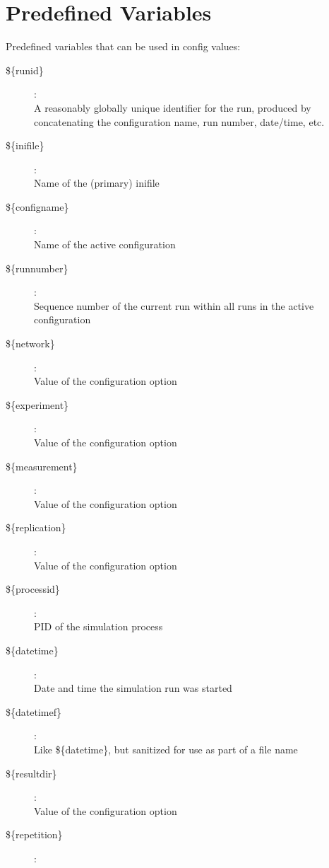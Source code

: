 \section{Predefined Variables}
\label{sec:config-options:predefined-variables}

Predefined variables that can be used in config values:

\begin{description}
\item[\$\{runid\}] : \\
    A reasonably globally unique identifier for the run, produced by
    concatenating the configuration name, run number, date/time, etc.
\item[\$\{inifile\}] : \\
    Name of the (primary) inifile
\item[\$\{configname\}] : \\
    Name of the active configuration
\item[\$\{runnumber\}] : \\
    Sequence number of the current run within all runs in the active
    configuration
\item[\$\{network\}] : \\
    Value of the  configuration option
\item[\$\{experiment\}] : \\
    Value of the  configuration option
\item[\$\{measurement\}] : \\
    Value of the  configuration option
\item[\$\{replication\}] : \\
    Value of the  configuration option
\item[\$\{processid\}] : \\
    PID of the simulation process
\item[\$\{datetime\}] : \\
    Date and time the simulation run was started
\item[\$\{datetimef\}] : \\
    Like \$\{datetime\}, but sanitized for use as part of a file name
\item[\$\{resultdir\}] : \\
    Value of the  configuration option
\item[\$\{repetition\}] : \\

\end{description}
